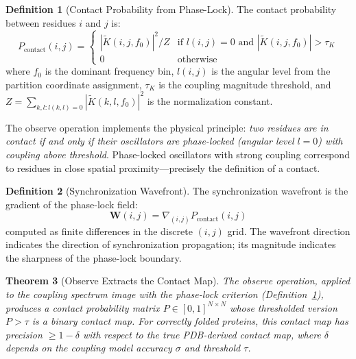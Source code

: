 \documentclass[11pt,twocolumn,a4paper]{article}
\newtheorem{theorem}{Theorem}[section]
\theoremstyle{definition}
\newtheorem{definition}[theorem]{Definition}
\theoremstyle{remark}
\newcommand{\Ktilde}{\tilde{K}}
\begin{document}
\begin{definition}[Contact Probability from Phase-Lock]
\label{def:contact_prob}
The contact probability between residues $i$ and $j$ is:
\begin{equation}
\label{eq:contact_prob}
P_{\text{contact}}(i, j) = \begin{cases}
|\Ktilde(i, j, f_0)|^2 / Z & \text{if } l(i,j) = 0 \text{ and } |\Ktilde(i,j,f_0)| > \tau_K \\
0 & \text{otherwise}
\end{cases}
\end{equation}
where $f_0$ is the dominant frequency bin, $l(i,j)$ is the angular level from the partition coordinate assignment, $\tau_K$ is the coupling magnitude threshold, and $Z = \sum_{k,l: l(k,l)=0} |\Ktilde(k,l,f_0)|^2$ is the normalization constant.
\end{definition}

The observe operation implements the physical principle: \emph{two residues are in contact if and only if their oscillators are phase-locked (angular level $l = 0$) with coupling above threshold}. Phase-locked oscillators with strong coupling correspond to residues in close spatial proximity---precisely the definition of a contact.

\begin{definition}[Synchronization Wavefront]
\label{def:wavefront}
The synchronization wavefront is the gradient of the phase-lock field:
\begin{equation}
\mathbf{W}(i, j) = \nabla_{(i,j)} P_{\text{contact}}(i, j)
\end{equation}
computed as finite differences in the discrete $(i, j)$ grid. The wavefront direction indicates the direction of synchronization propagation; its magnitude indicates the sharpness of the phase-lock boundary.
\end{definition}

\begin{theorem}[Observe Extracts the Contact Map]
\label{thm:observe_contacts}
The observe operation, applied to the coupling spectrum image with the phase-lock criterion (Definition~\ref{def:contact_prob}), produces a contact probability matrix $P \in [0,1]^{N \times N}$ whose thresholded version $P > \tau$ is a binary contact map. For correctly folded proteins, this contact map has precision $\geq 1 - \delta$ with respect to the true PDB-derived contact map, where $\delta$ depends on the coupling model accuracy $\sigma$ and threshold $\tau$.
\end{theorem}
\end{document}
